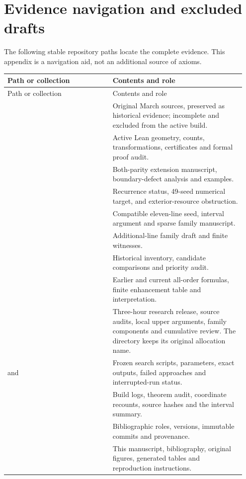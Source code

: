 

\section{Evidence navigation and excluded drafts}\label{app:evidence}

The following stable repository paths locate the complete evidence. This appendix is a navigation aid, not an additional source of axioms.
\begin{longtable}{@{}P{0.42\linewidth}P{0.53\linewidth}@{}}
\toprule Path or collection & Contents and role\\\midrule\endfirsthead
\toprule Path or collection & Contents and role\\\midrule\endhead
\bottomrule\endfoot
{} & Original March sources, preserved as historical evidence; incomplete and excluded from the active build.\\
 & Active Lean geometry, counts, transformations, certificates and formal proof audit.\\
 & Both-parity extension manuscript, boundary-defect analysis and examples.\\
 & Recurrence status, 49-seed numerical target, and exterior-resource obstruction.\\
 & Compatible eleven-line seed, interval argument and sparse family manuscript.\\
 & Additional-line family draft and finite witnesses.\\
 & Historical inventory, candidate comparisons and priority audit.\\
 & Earlier and current all-order formulas, finite enhancement table and interpretation.\\
 & Three-hour research release, source audits, local upper arguments, family components and cumulative review. The directory keeps its original allocation name.\\
 and  & Frozen search scripts, parameters, exact outputs, failed approaches and interrupted-run status.\\
 & Build logs, theorem audit, coordinate recounts, source hashes and the interval summary.\\
 & Bibliographic roles, versions, immutable commits and provenance.\\
 & This manuscript, bibliography, original figures, generated tables and reproduction instructions.\\
\end{longtable}

